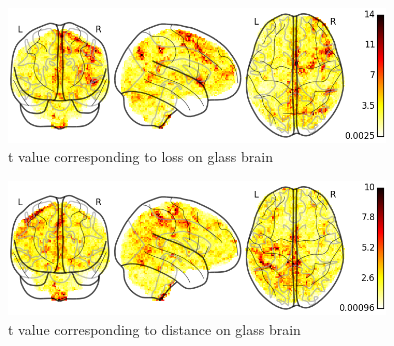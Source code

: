 \begin{figure}[h!]
\centering
\includegraphics[width=100mm]{images/t_glass_brain_loss.png}               
\caption{t value corresponding to loss on glass brain}
\label{fig:t_glass2}
\end{figure}

\begin{figure}[h!]
\centering
\includegraphics[width=100mm]{images/t_glass_brain_dist.png}               
\caption{t value corresponding to distance on glass brain}
\label{fig:t_glass3}
\end{figure}
